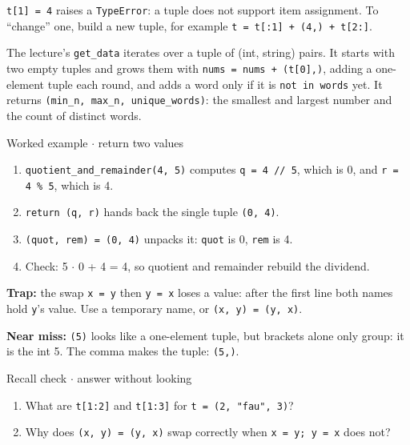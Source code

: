 \documentclass[11pt]{article}
\begin{document}
\begin{keepsection}
\texttt{t[1] = 4} raises a \texttt{TypeError}: a tuple does not support item assignment. To “change” one, build a new tuple, for example \texttt{t = t[:1] + (4,) + t[2:]}.

The lecture’s \texttt{get\_data} iterates over a tuple of (int, string) pairs. It starts with two empty tuples and grows them with \texttt{nums = nums + (t[0],)}, adding a one-element tuple each round, and adds a word only if it is \texttt{not in words} yet. It returns \texttt{(min\_n, max\_n, unique\_words)}: the smallest and largest number and the count of distinct words.

\begin{workedbox}{Worked example \ensuremath{\cdot} return two values}
\begin{enumerate}
\item \texttt{quotient\_and\_remainder(4, 5)} computes \texttt{q = 4 // 5}, which is 0, and \texttt{r = 4 \% 5}, which is 4.
\item \texttt{return (q, r)} hands back the single tuple \texttt{(0, 4)}.
\item \texttt{(quot, rem) = (0, 4)} unpacks it: \texttt{quot} is 0, \texttt{rem} is 4.
\item Check: 5 \ensuremath{\cdot} 0 + 4 = 4, so quotient and remainder rebuild the dividend.
\end{enumerate}
\end{workedbox}

\begin{notebox}\textbf{Trap:} the swap \texttt{x = y} then \texttt{y = x} loses a value: after the first line both names hold \texttt{y}’s value. Use a temporary name, or \texttt{(x, y) = (y, x)}.\end{notebox}

\begin{notebox}\textbf{Near miss:} \texttt{(5)} looks like a one-element tuple, but brackets alone only group: it is the int 5. The comma makes the tuple: \texttt{(5,)}.\end{notebox}

\begin{recallbox}{Recall check \ensuremath{\cdot} answer without looking}
\begin{enumerate}
\item What are \texttt{t[1:2]} and \texttt{t[1:3]} for \texttt{t = (2, "fau", 3)}?
\item Why does \texttt{(x, y) = (y, x)} swap correctly when \texttt{x = y; y = x} does not?
\end{enumerate}

\end{recallbox}
\end{keepsection}
\end{document}
